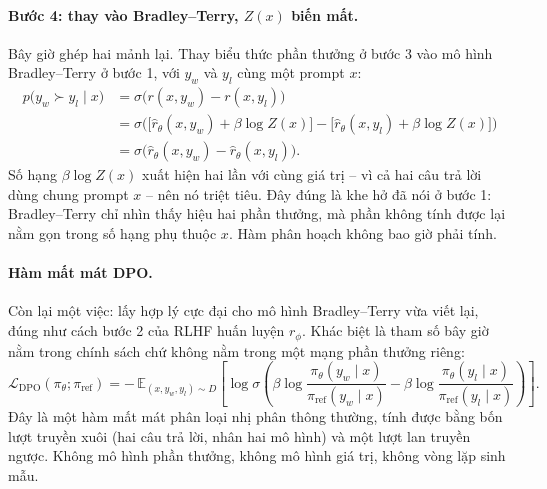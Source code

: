 \paragraph{Bước 4: thay vào Bradley--Terry, \( Z(x) \) biến mất.}
Bây giờ ghép hai mảnh lại. Thay biểu thức phần thưởng ở bước 3 vào mô hình Bradley--Terry ở bước 1, với \( y_w \) và \( y_l \) cùng một prompt \( x \):
\[
\begin{aligned}
    p\big(y_w \succ y_l \mid x\big)
    &= \sigma\big( r(x,y_w) - r(x,y_l) \big) \\[4pt]
    &= \sigma\Big(
        \big[\hat{r}_{\theta}(x,y_w) + \beta \log Z(x)\big]
        - \big[\hat{r}_{\theta}(x,y_l) + \beta \log Z(x)\big]
    \Big) \\[4pt]
    &= \sigma\big( \hat{r}_{\theta}(x,y_w) - \hat{r}_{\theta}(x,y_l) \big).
\end{aligned}
\]
Số hạng \( \beta \log Z(x) \) xuất hiện hai lần với cùng giá trị -- vì cả hai câu trả lời dùng chung prompt \( x \) -- nên nó triệt tiêu. Đây đúng là khe hở đã nói ở bước 1: Bradley--Terry chỉ nhìn thấy hiệu hai phần thưởng, mà phần không tính được lại nằm gọn trong số hạng phụ thuộc \( x \). Hàm phân hoạch không bao giờ phải tính.

\paragraph{Hàm mất mát DPO.}
Còn lại một việc: lấy hợp lý cực đại cho mô hình Bradley--Terry vừa viết lại, đúng như cách bước 2 của RLHF huấn luyện \( r_{\phi} \). Khác biệt là tham số bây giờ nằm trong chính sách chứ không nằm trong một mạng phần thưởng riêng:
\[
    \mathcal{L}_{\text{DPO}}(\pi_{\theta}; \pi_{\text{ref}})
    = -\,\mathbb{E}_{(x, y_w, y_l) \sim D}
    \left[
        \log \sigma\!\left(
            \beta \log \frac{\pi_{\theta}(y_w \mid x)}{\pi_{\text{ref}}(y_w \mid x)}
            - \beta \log \frac{\pi_{\theta}(y_l \mid x)}{\pi_{\text{ref}}(y_l \mid x)}
        \right)
    \right].
\]
Đây là một hàm mất mát phân loại nhị phân thông thường, tính được bằng bốn lượt truyền xuôi (hai câu trả lời, nhân hai mô hình) và một lượt lan truyền ngược. Không mô hình phần thưởng, không mô hình giá trị, không vòng lặp sinh mẫu.


